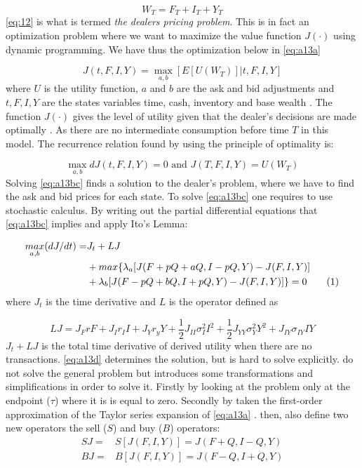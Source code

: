 \documentclass{kththesis}
\theoremstyle{definition}
\newcommand\numberthis{\addtocounter{equation}{1}\tag{\theequation}}
\begin{document}
\begin{equation}
    \label{eq:a12}
    W_{T} = F_{T} + I_{T} + Y_{T}
\end{equation}
\autoref{eq:12} is what is termed \textit{the dealers pricing problem}. This is in fact an optimization problem where we want to maximize the value function $J(\cdot)$ using dynamic programming. We have thus the optimization below in \autoref{eq:a13a}

\begin{equation}
    \label{eq:a13a}
    J(t,F,I,Y) = \underset{a,b}{\max}[E[U(W_T)] | t,F,I,Y]
\end{equation}
where $U$ is the utility function, $a$ and $b$ are the ask and bid adjustments and $t, F, I,Y$ are the states variables time, cash, inventory and base wealth \parencite{o1995market}. The function $J(\cdot)$ gives the level of utility given that the dealer's decisions are made optimally \parencite{o1995market}. As there are no intermediate consumption before time $T$ in this model. The recurrence relation found by using the principle of optimality is:

\begin{equation}
    \label{eq:a13bc}
    \underset{a,b}{\max}dJ(t,F,I,Y)=0 \text{ and } 
    J(T,F,I,Y)=U(W_T)
\end{equation}
Solving \autoref{eq:a13bc} finds a solution to the dealer's problem, where we have to find the ask and bid prices for each state. To solve \autoref{eq:a13bc} one requires to use stochastic calculus. By writing out the partial differential equations that \autoref{eq:a13bc} implies and apply Ito's Lemma:

\begin{align*}
    \label{eq:a13d}
    \underset{a,b}{max}(dJ/dt) = & J_t + LJ \\
    & + max\{\lambda_a[J(F+pQ+aQ, I-pQ,Y) - J(F,I,Y)] \\
    & + \lambda_b [J(F-pQ+bQ, I+pQ,Y) - J(F,I,Y)] \} = 0 \numberthis
\end{align*}
where $J_t$ is the time derivative and $L$ is the operator defined as

\begin{equation}
    LJ = J_{F}rF + J_{I}r_{I}I+J_{Y}r_{y}Y+\frac{1}{2}J_{II}\sigma^{2}_{I}I^{2}+ \frac{1}{2}J_{YY}\sigma^{2}_{Y}Y^{2} + J_{IY}\sigma_{IY}IY
\end{equation}
$J_t + LJ$ is the total time derivative of derived utility when there are no transactions. \autoref{eq:a13d} determines the solution, but is hard to solve explicitly. \textcite{ho1981optimal} do not solve the general problem but introduces some transformations and simplifications in order to solve it. Firstly by looking at the problem only at the endpoint ($\tau$) where it is is equal to zero. Secondly by taken the first-order approximation of the Taylor series expansion of \autoref{eq:a13a} \parencite{o1995market}. \textcite{ho1981optimal} then, also define two new operators the sell ($S$) and buy ($B$) operators:
\begin{align}
    \label{eq:a13e}
    SJ = & S[J(F,I,Y)] = J(F+Q,I-Q, Y) \\
    BJ = & B[J(F,I,Y)] = J(F-Q, I+Q, Y)
\end{align}
\end{document}
